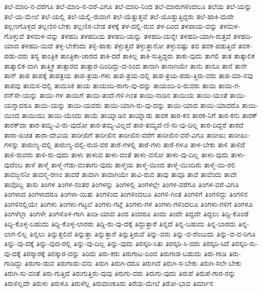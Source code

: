 {ತಲೆ-ಮಾರಿ-ನ-ವರೆಗೂ
ತಲೆ-ಮಾರಿ-ನ-ವರೆ-ವಿಗೂ
ತಲೆ-ಮಾರಿ-ನಿಂದ
ತಲೆ-ಮಾರುಗಳಿಂದಲೂ
ತಲೆಯ
ತಲೆ-ಯನ್ನು
ತಲೆ-ಯ-ಮೇಲೆ
ತಲೆ-ಯಲ್ಲಿ
ತಲೆ-ಯಲ್ಲಿ-ರುವಾಗ
ತಲೆ-ಯೆತ್ತುತ್ತವೆ
ತಲೆ-ಯೊಡ್ಡುತ್ತಿದ್ದರು
ತಲೆ-ಹಾಕಿ-ದುದೇ
ತಲ್ಲಣಗೊಳ್ಳದ
ತಲ್ಲಣಿಸ-ಬೇಕು
ತಲ್ಲಣಿಸ-ಬೇಡ
ತಳಕ್ಕೆ
ತಳ-ದಲ್ಲಿ-ರುವ
ತಳ-ದಿಂದ
ತಳಪಾಯ-ವನ್ನು
ತಳಮಳ-ಗೊಳ್ಳುವೆ
ತಳಮಳ-ವನ್ನು
ತಳಹದಿ
ತಳಹದಿಯ
ತಳಹದಿ-ಯನ್ನು
ತಳಹದಿ-ಯನ್ನೇ
ತಳಹದಿ-ಯಾಗಿ-ರುತ್ತವೆ
ತಳಹದಿ-ಯಾದ
ತಳಹದಿ-ಯಿದೆ
ತಳ್ಳ-ಬೇಕೆಂದು
ತಳ್ಳಿ-ಹಾಕು
ತಳ್ಳುತ್ತದೆ
ತಳ್ಳುತ್ತಾನೋ
ತಳ್ಳುವಷ್ಟು
ತವ
ತವಕ-ಪಡುತ್ತಿದೆ
ತವಕ-ಪಡು-ವರು
ತಸ್ಯ
ತಾಂತ್ರಿಕ
ತಾಂತ್ರಿಕಾ-ಚಾರದ
ತಾಕಿ-ದರೆ
ತಾಕಿಲ್ಲ
ತಾಕಿ-ಸುತ್ತಿದ್ದರು
ತಾಕು-ವುದು
ತಾಗಲಿ
ತಾತ
ತಾತ್ಕಾಲಿಕ
ತಾತ್ಕಾಲಿಕ-ವಾಗಿ
ತಾತ್ತ್ವಿಕ
ತಾತ್ಸಾರದ
ತಾತ್ಸಾರ-ದಿಂದಿದ್ದು-ದ-ರಿಂದ
ತಾನಾಗಿ
ತಾನಾಗಿಯೇ
ತಾನು
ತಾನೂ
ತಾನೆ
ತಾನೇ
ತಾನ್
ತಾಪ
ತಾಪಕ್ಕೆ
ತಾಪತ್ರಯ
ತಾಪ-ತ್ರಯ-ಗಳು
ತಾಪ-ತ್ರಯ-ದಲ್ಲಿ
ತಾಪ-ತ್ರಯ-ಪಡು-ತ್ತಿರು-ವರು
ತಾಪ-ಮಾ-ನವು
ತಾಪವು
ತಾಮಸ-ದಲ್ಲಿ
ತಾಮಸಿಕ
ತಾಯ
ತಾಯಂದಿ-ರಾಗು-ವು-ದನ್ನು
ತಾಯಂದಿ-ರಿ-ರುವರು
ತಾಯಿ
ತಾಯಿ-ಗ-ರನ್‌ಸೇ-ಯನ್ನು
ತಾಯಿ-ಗಳ
ತಾಯಿಗೆ
ತಾಯಿ-ತಂದೆ-ಗಳಿ-ಗಿಂತ
ತಾಯಿ-ನಾಡಿನ
ತಾಯಿಯ
ತಾಯಿ-ಯಂತೆ
ತಾಯಿ-ಯನ್ನಾದರೂ
ತಾಯಿ-ಯನ್ನು
ತಾಯಿ-ಯವರು
ತಾಯಿ-ಯಾಗಿ-ರು-ವು-ದನ್ನು
ತಾಯಿ-ಯಾದ
ತಾಯಿ-ಯಾದರೊ
ತಾಯಿ-ಯಿಂದ
ತಾಯಿಯು
ತಾಯಿ-ಯೆಂದು
ತಾಯೆ
ತಾಯ್ನಾಡಿನ
ತಾಯ್ನಾಡು
ತಾರಕ
ತಾರ-ಕನ
ತಾರಕ-ನಿಗೆ
ತಾರ-ಕನು
ತಾರಕ್
ತಾರಕ್‌ದಾ
ತಾರ-ತಮ್ಯ-ವಿ-ರು-ವುದೋ
ತಾರ-ತಮ್ಯ-ವಿಲ್ಲದೆ
ತಾರ-ತಮ್ಯವೆ-ಣಿ-ಸು-ವು-ದಿಲ್ಲ
ತಾರ-ದಿದ್ದರೆ
ತಾರದೆ
ತಾರಾ-ಖಚಿತ
ತಾರಾ-ದೇವಿಯ
ತಾರೀಖಿಗೆ
ತಾರೀಖಿನ
ತಾರೀಖಿನ-ವರೆಗೆ
ತಾರೀಖಿನ-ವರೆ-ವಿಗೂ
ತಾರೀಖು
ತಾರೀಖು-ಗಳನ್ನು
ತಾರುಣ್ಯ-ದಲ್ಲಿ
ತಾರುಣ್ಯ-ದಲ್ಲಿ-ರುವ-ವರ
ತಾರೆ-ಗಳಲ್ಲಿ
ತಾರೆ-ಗಳು
ತಾರೆ-ಗಳೂ
ತಾಳ-ಬೇಕು
ತಾಳಿ
ತಾಳಿದೆ
ತಾಳಿ-ರುವರು
ತಾಳಿ-ರು-ವುದು
ತಾಳು
ತಾಳುವ
ತಾಳು-ವಂತೆ
ತಾಳು-ವನೋ
ತಾಳು-ವು-ದಿಲ್ಲ
ತಾಳು-ವುದು
ತಾಳು-ವುದೆಂಬ
ತಾಳೆ
ತಾಳ್ಮೆ
ತಾಳ್ಮೆ-ಗೆಡು-ವಂತಾಗು-ವುದು
ತಾಳ್ಮೆಯ
ತಾಳ್ಮೆ-ಯಿಂದ
ತಾಳ್ಮೆ-ಯಿಂದಿರು
ತಾಳ್ಮೆ-ಯಿ-ರಲಿ
ತಾವಜ್ಜನನೀ
ತಾವನ್ಮ-ರಣಂ
ತಾವರೆ
ತಾವಾಗಿ
ತಾವಾಗಿಯೇ
ತಾವಿ-ರುವ
ತಾವು
ತಾವೂ
ತಾವೆ
ತಾವೆಂದು
ತಾವೇ
ತಾವೊಬ್ಬ
ತಾಸು
ತಿಂಗಳ
ತಿಂಗಳ-ನಂತರ
ತಿಂಗಳನ್ನು
ತಿಂಗಳಲ್ಲಿ
ತಿಂಗಳಲ್ಲೇ
ತಿಂಗಳ-ವರೆಗೂ
ತಿಂಗಳ-ವರೆ-ವಿಗೂ
ತಿಂಗಳಾದ
ತಿಂಗಳಾದರೂ
ತಿಂಗಳಾ-ಯಿತು
ತಿಂಗಳಿಂದ
ತಿಂಗಳಿಂದಲೂ
ತಿಂಗಳಿ-ಗಿಂತ
ತಿಂಗಳಿಗೆ
ತಿಂಗಳಿದ್ದು
ತಿಂಗಳಿನ
ತಿಂಗಳಿನಲ್ಲಿಯೇ
ತಿಂಗಳು
ತಿಂಗಳು-ಗಟ್ಟಲೆ
ತಿಂಗಳು-ಗಟ್ಲೆ
ತಿಂಗಳು-ಗಳ
ತಿಂಗಳು-ಗಳಿಂದಲೂ
ತಿಂಗಳು-ಗಳಿಗೆ
ತಿಂಗಳೂ
ತಿಂಗಳೆಲ್ಲಾ
ತಿಂಗಳೇ
ತಿಂಗಳೊಳ-ಗಾಗಿ
ತಿಂಡಿ-ಯಾದ
ತಿಂದ
ತಿಂದರೂ
ತಿಂದು
ತಿಂದೇ
ತಿದ್ದದೇ
ತಿದ್ದಲು
ತಿದ್ದಿ-ಕೊಂಡೆ
ತಿದ್ದಿ-ಕೊಳ್ಳ-ಬಹುದು
ತಿದ್ದಿ-ಕೊಳ್ಳ-ಲಾರರು
ತಿದ್ದಿ-ರು-ವು-ದಕ್ಕೆ
ತಿದ್ದುತ್ತಾರೆ
ತಿನ್ನದೆ
ತಿನ್ನ-ಬಹುದು
ತಿನ್ನ-ಬಾರದು
ತಿನ್ನ-ಲಾಗ-ಲಿಲ್ಲ
ತಿನ್ನಲು
ತಿನ್ನುತ್ತಲಿದೆ
ತಿನ್ನುತ್ತಾ
ತಿನ್ನುತ್ತಾರೆ
ತಿನ್ನುತ್ತಿರುವೆ
ತಿನ್ನು-ವರು
ತಿನ್ನು-ವ-ರೆಂಬುದು
ತಿನ್ನು-ವ-ವ-ರಿಗೂ
ತಿನ್ನು-ವು-ದಕ್ಕೆ
ತಿನ್ನು-ವುದ-ರಲ್ಲಿ
ತಿನ್ನು-ವು-ದಿಲ್ಲ
ತಿನ್ನು-ವುದು
ತಿರಸ್ಕರಿ-ಸಿತು
ತಿರಸ್ಕರಿ-ಸಿ-ದರು
ತಿರಸ್ಕರಿ-ಸಿದೆ
ತಿರಸ್ಕರಿ-ಸು-ವು-ದಕ್ಕೆ
ತಿರಸ್ಕಾರಕ್ಕೆ
ತಿರಸ್ಕಾರ-ವನ್ನು
ತಿರಿದು
ತಿರು-ಕರು
ತಿರುಗಾಟ-ದಿಂದ
ತಿರುಗಾಡ-ಬಹುದು
ತಿರು-ಗಾಡಿ
ತಿರು-ಗಾಡಿದ್ದು
ತಿರುಗಾ-ಡುವ
ತಿರುಗಾಡು-ವನು
ತಿರುಗಿ
ತಿರುಗಿ-ದರೂ
ತಿರುಗಿದೆ
ತಿರುಗಿ-ಸ-ಬೇಕು
ತಿರುಗಿ-ಸಲೇ-ಬೇಕು
ತಿರುಗಿ-ಸು-ವಂತೆ
ತಿರು-ಗುತ್ತಿದೆ
ತಿರುಗುತ್ತಿರು-ವುವು
ತಿರುಗು-ವರು
ತಿರುಗು-ವುದು
ತಿರುಪೆ
ತಿರುಪೆ-ಗಾರ-ರನ್ನು
ತಿರುಳಿಲ್ಲದೇ
ತಿರುಳು
ತಿರುಳೂ
ತಿರುಳೆಲ್ಲ
ತಿರುವಾಂಕೂರು
ತಿರೆಯ-ಮೇಲೆ
ತಿರೋ-ಭಾವ
ತಿರ್ಮಾನ
}
